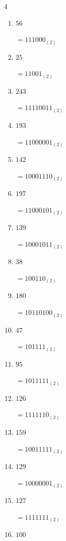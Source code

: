 \begin{multicols}{4}
\begin{enumerate}
        $=1100010_{(2)}$

  \item $56$

        $=111000_{(2)}$

\columnbreak %

\resetques

  \item $25$

        $=11001_{(2)}$

  \item $243$

        $=11110011_{(2)}$

  \item $193$

        $=11000001_{(2)}$

  \item $142$

        $=10001110_{(2)}$

  \item $197$

        $=11000101_{(2)}$

  \item $139$

        $=10001011_{(2)}$

  \item $38$

        $=100110_{(2)}$

  \item $180$

        $=10110100_{(2)}$

  \item $47$

        $=101111_{(2)}$

  \item $95$

        $=1011111_{(2)}$

  \item $126$

        $=1111110_{(2)}$

  \item $159$

        $=10011111_{(2)}$

  \item $129$

        $=10000001_{(2)}$

  \item $127$

        $=1111111_{(2)}$

  \item $100$


\end{enumerate}
\end{multicols}
